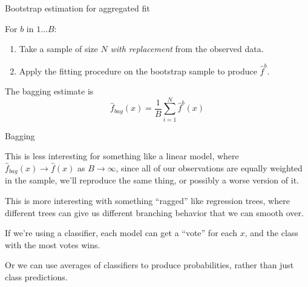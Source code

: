 \documentclass[xcolor={table}, handout]{beamer}
\begin{document}

\begin{frame}{Bootstrap estimation for aggregated fit}

\begin{wideitemize}
\item For $b$ in $1\dots B$:\pause
\begin{enumerate}

    \item Take a sample of size $N$  \textit{with replacement} from the observed data. \pause

    \item Apply the fitting procedure on the bootstrap sample to produce $\hat f^b$.
    \end{enumerate}
\pause
\item The bagging estimate is 
\[
\hat f_{bag}(x) = \frac{1}{B}\sum_{i = 1}^N \hat f^b(x)
\]
\end{wideitemize}

\end{frame}





\begin{frame}{Bagging}

\begin{wideitemize}
\item This is less interesting for something like a linear model, where $\hat f_{bag}(x) \to \hat f(x)$ as $B \to \infty$, since all of our observations are equally weighted in the sample, we'll reproduce the same thing\pause, or possibly a worse version of it. \pause
\item This is more interesting with something ``ragged'' like regression trees, where different trees can give us different branching behavior that we can smooth over. \pause 
\item If we're using a classifier, each model can get a ``vote'' for each $x$, and the class with the most votes wins. \pause
\item Or we can use averages of classifiers to produce probabilities, rather than just class predictions. 
\end{wideitemize}

\end{frame}
\end{document}
